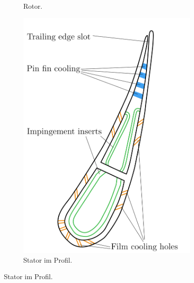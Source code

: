 \documentclass[8pt, aspectratio=169]{beamer}
\begin{document}
\begin{frame}
\begin{minipage}[t]{0.48\textwidth}
\begin{figure}[H]
\begin{subfigure}{.49\textwidth}
				\caption{Rotor.}
			\end{subfigure}
			\begin{subfigure}{.49\textwidth}
				\centering
				\includegraphics[width=.9\textwidth]{../../assets/gth_rebuild/11.png}
				\caption{Stator im Profil.}
			\end{subfigure}
		\end{figure}
	\end{minipage}
	\vfill
\end{frame}
\end{document}
